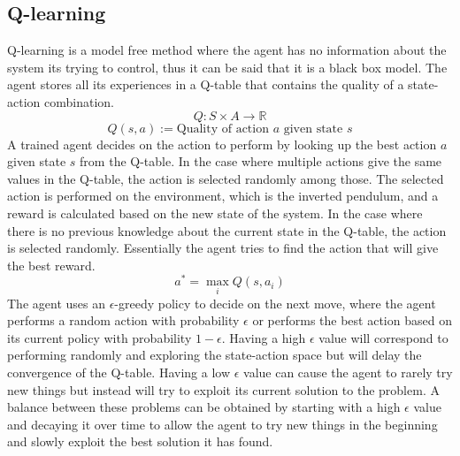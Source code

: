 \documentclass{LTHtwocol} %
\begin{document}
\subsection{Q-learning}
Q-learning is a model free method \cite{original_q_learning} where the agent has no information about the system its trying to control, thus it can be said that it is a black box model.
The agent stores all its experiences in a Q-table that contains the quality of a state-action combination.
\begin{equation}
Q : S \times A  \to \mathbb{R}
\end{equation}
\[Q(s,a) := \text{Quality of action $a$ given state  $s$} \]
A trained agent decides on the action to perform by looking up the best action $a$ given state $s$ from the Q-table.
In the case where multiple actions give the same values in the Q-table, the action is selected randomly among those.
The selected action is performed on the environment, which is the inverted pendulum, and a reward is calculated based on the new state of the system.
In the case where there is no previous knowledge about the current state in the Q-table, the action is selected randomly.
Essentially the agent tries to find the action that will give the best reward.
\begin{equation}
 a^* = \max_i Q(s,a_i)
\end{equation}
The agent uses an $\epsilon$-greedy policy to decide on the next move, where the agent performs a random action with probability $\epsilon$ or performs the best action based on its current policy with probability $1-\epsilon$.
Having a high $\epsilon$ value will correspond to performing randomly and exploring the state-action space but will delay the convergence of the Q-table. 
Having a low $\epsilon$ value can cause the agent to rarely try new things but instead will try to exploit its current solution to the problem.
A balance between these problems can be obtained by starting with a high $\epsilon$ value and decaying it over time to allow the agent to try new things in the beginning and slowly exploit the best solution it has found. 
\end{document}
